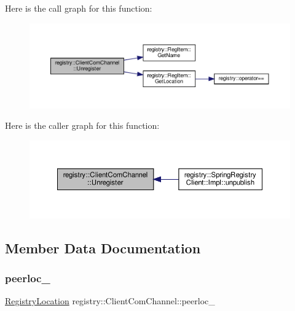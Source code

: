 Here is the call graph for this function\+:
\nopagebreak
\begin{figure}[H]
\begin{center}
\leavevmode
\includegraphics[width=350pt]{classregistry_1_1ClientComChannel_a74566850580e7071fb6ec0f1f0498d05_cgraph}
\end{center}
\end{figure}
Here is the caller graph for this function\+:\nopagebreak
\begin{figure}[H]
\begin{center}
\leavevmode
\includegraphics[width=350pt]{classregistry_1_1ClientComChannel_a74566850580e7071fb6ec0f1f0498d05_icgraph}
\end{center}
\end{figure}


\subsection{Member Data Documentation}
\mbox{\label{classregistry_1_1ClientComChannel_ac59fe755362be649e2ec1ee555d2ead8}} 
\subsubsection{\texorpdfstring{peerloc\+\_\+}{peerloc\_}}
{\footnotesize\ttfamily \hyperlink{structregistry_1_1RegistryLocation}{Registry\+Location} registry\+::\+Client\+Com\+Channel\+::peerloc\+\_\+\hspace{0.3cm}{\ttfamily [private]}}



